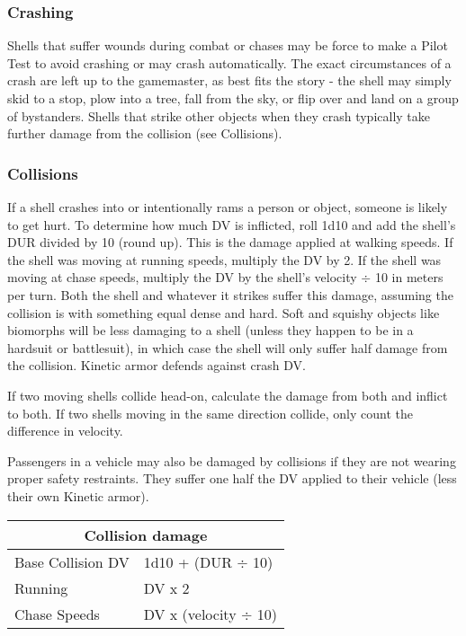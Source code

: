\subsubsection{Crashing}

Shells that suffer wounds during combat or chases may be force to make a Pilot Test to avoid crashing or may crash automatically. The exact circumstances of a crash are left up to the gamemaster, as best fits the story - the shell may simply skid to a stop, plow into a tree, fall from the sky, or flip over and land on a group of bystanders. Shells that strike other objects when they crash typically take further damage from the collision (see Collisions).

\subsubsection{Collisions}

If a shell crashes into or intentionally rams a person or object, someone is likely to get hurt. To determine how much DV is inflicted, roll 1d10 and add the shell’s DUR divided by 10 (round up). This is the damage applied at walking speeds. If the shell was moving at running speeds, multiply the DV by 2. If the shell was moving at chase speeds, multiply the DV by the shell’s velocity $\div$ 10 in meters per turn. Both the shell and whatever it strikes suffer this damage, assuming the collision is with something equal dense and hard. Soft and squishy objects like biomorphs will be less damaging to a shell (unless they happen to be in a hardsuit or battlesuit), in which case the shell will only suffer half damage from the collision. Kinetic armor defends against crash DV.

If two moving shells collide head-on, calculate the damage from both and inflict to both. If two shells moving in the same direction collide, only count the difference in velocity.

Passengers in a vehicle may also be damaged by collisions if they are not wearing proper safety restraints. They suffer one half the DV applied to their vehicle (less their own Kinetic armor).

\begin{table} \begin{tabular}{|l|l|}
\hline \multicolumn{2}{|c|}{\textbf{Collision damage}} \\
\hline Base Collision DV	& 1d10 + (DUR $\div$ 10) \\
\hline Running			& DV x 2 \\
\hline Chase Speeds		& DV x (velocity $\div$ 10) \\
\hline
\end{tabular}
\label{table:collision-damage}
\end{table}

